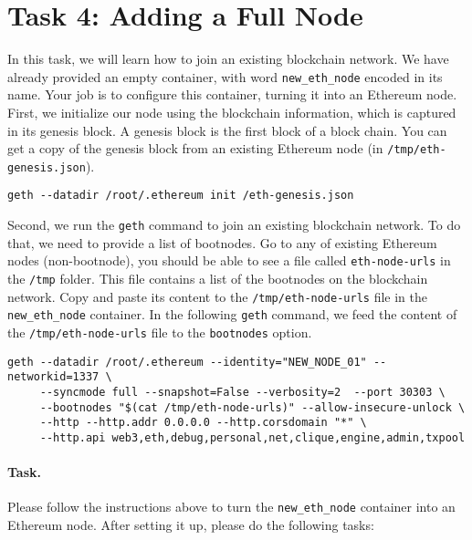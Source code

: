 \section{Task 4: Adding a Full Node} 

In this task, we will learn how to join an existing blockchain network.
We have already provided an empty container, with 
word \texttt{new\_eth\_node} encoded in its name. 
Your job is to configure this container, turning it into an Ethereum node. 
First, we initialize our node using the blockchain information,
which is captured in its genesis block. 
A genesis block is the first block of a block chain. You can get a copy
of the genesis block from an existing Ethereum node (in \texttt{/tmp/eth-genesis.json}).  

\begin{lstlisting}
geth --datadir /root/.ethereum init /eth-genesis.json
\end{lstlisting}

Second, we run the \texttt{geth} command to join 
an existing blockchain network. To do that, 
we need to provide a list of bootnodes. Go to any of 
existing Ethereum nodes (non-bootnode), you should be able to 
see a file called \texttt{eth-node-urls} in the \texttt{/tmp}
folder. This file contains a list of the bootnodes on the blockchain
network. Copy and paste its content to the \texttt{/tmp/eth-node-urls}
file in the \texttt{new\_eth\_node} container. 
In the following \texttt{geth} command, we feed
the content of the \texttt{/tmp/eth-node-urls} file 
to the \texttt{bootnodes} option.

\begin{lstlisting}[caption=\texttt{start.sh}]
geth --datadir /root/.ethereum --identity="NEW_NODE_01" --networkid=1337 \
     --syncmode full --snapshot=False --verbosity=2  --port 30303 \
     --bootnodes "$(cat /tmp/eth-node-urls)" --allow-insecure-unlock \      
     --http --http.addr 0.0.0.0 --http.corsdomain "*" \
     --http.api web3,eth,debug,personal,net,clique,engine,admin,txpool
\end{lstlisting}


\paragraph{Task.} Please follow the instructions above to 
turn the \texttt{new\_eth\_node} container into an Ethereum node. 
After setting it up, please do the following tasks: 

